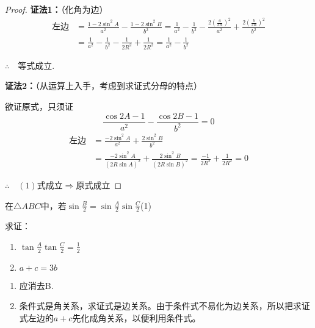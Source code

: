 \begin{proof}
\textbf{证法1：}（化角为边）
\[\begin{split}
\text{左边}&=\frac{1-2\sin^2A}{a^2}-\frac{1-2\sin^2B}{b^2}=\frac{1}{a^2}-\frac{1}{b^2}-\frac{2\left(\frac{a}{2R}\right)^2}{a^2}+\frac{2\left(\frac{b}{2R}\right)^2}{b^2}\\
&=\frac{1}{a^2}-\frac{1}{b^2}-\frac{1}{2R^2}+\frac{1}{2R^2}=\frac{1}{a^2}-\frac{1}{b^2}
\end{split}\]

$\therefore\quad $等式成立.

\textbf{证法2：}（从运算上入手，考虑到求证式分母的特点）

欲证原式，只须证
\begin{equation}
    \frac{\cos 2A-1}{a^2}-\frac{\cos 2B-1}{b^2}=0 \tag{1}
\end{equation}
\[\begin{split}
\text{左边}&=\frac{-2\sin^2 A}{a^2}+\frac{2\sin^2 B}{b^2}\\
&=\frac{-2\sin^2 A}{(2R\sin A)^2}+\frac{2\sin^2 B}{(2R\sin B)^2}=\frac{-1}{2R^2}+\frac{1}{2R^2}=0
\end{split}\]

$\therefore\quad (1)\text{式成立}\Rightarrow\text{原式成立}$
\end{proof}


\begin{example}
在$\triangle ABC$中，若$\sin\frac{B}{2}=\sin\frac{A}{2}\sin\frac{C}{2}$\hfill(1)

求证： \begin{enumerate}[(1)]
    \item $\tan\frac{A}{2}\tan\frac{C}{2}=\frac{1}{2}$
    \item $a+c=3b$
\end{enumerate}
\end{example}

\begin{analyze}
\begin{enumerate}[(1)]
    \item 应消去B.
    \item 条件式是角关系，求证式是边关系。由于条件式不易化为边关系，所以把求证式左边的$a+c$先化成角关系，以便利用条件式。
\end{enumerate}
\end{analyze}

